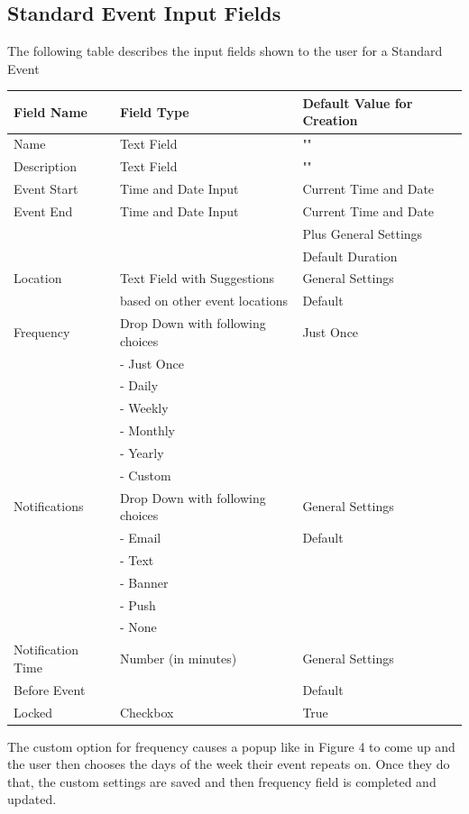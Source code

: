 \documentclass{scrreprt}
\begin{document}
\subsection{Standard Event Input Fields}
The following table describes the input fields shown to the user for a Standard Event
\begin{center}
\begin{longtable}{ | p{3cm} | p{8cm} | p{4cm} | }
\hline
\textbf{Field Name} & \textbf{Field Type} & \textbf{Default Value for Creation} \\
\hline
Name & Text Field & "" \\
\hline
Description & Text Field & "" \\
\hline
Event Start & Time and Date Input & Current Time and Date \\
\hline
Event End & Time and Date Input & Current Time and Date \\
& & Plus General Settings \\
& & Default Duration \\
\hline
Location & Text Field with Suggestions & General Settings \\
& based on other event locations & Default \\
\hline
Frequency & Drop Down with following choices & Just Once \\
& - Just Once & \\
& - Daily & \\
& - Weekly & \\
& - Monthly & \\
& - Yearly & \\
& - Custom & \\
\hline
Notifications & Drop Down with following choices & General Settings\\
& - Email & Default\\
& - Text & \\
& - Banner & \\
& - Push & \\
& - None & \\
\hline
Notification Time & Number (in minutes) & General Settings \\
Before Event & & Default \\
\hline
Locked & Checkbox & True \\
\hline
\end{longtable}
\end{center}

The custom option for frequency causes a popup like in Figure 4 to come up and the user then chooses the days of the week their event repeats on.  Once they do that, the custom settings are saved and then frequency field is completed and updated.
\end{document}
